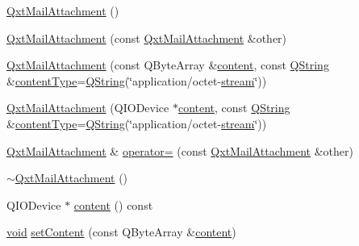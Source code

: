 \begin{DoxyCompactItemize}
\item 
\hyperlink{class_qxt_mail_attachment_a57fe8964d1858588d0a29f92b3d8db18}{Qxt\-Mail\-Attachment} ()
\item 
\hyperlink{class_qxt_mail_attachment_a2debcb1aa2891705bdfe0d49519b45c6}{Qxt\-Mail\-Attachment} (const \hyperlink{class_qxt_mail_attachment}{Qxt\-Mail\-Attachment} \&other)
\item 
\hyperlink{class_qxt_mail_attachment_a4b949899fa7ee16440ef40bc3560d8dc}{Qxt\-Mail\-Attachment} (const Q\-Byte\-Array \&\hyperlink{class_qxt_mail_attachment_a5be7967f47e110eabb937bd3642979cf}{content}, const \hyperlink{group___u_a_v_objects_plugin_gab9d252f49c333c94a72f97ce3105a32d}{Q\-String} \&\hyperlink{class_qxt_mail_attachment_ad94b991e86cd752c240556d5ccba3134}{content\-Type}=\hyperlink{group___u_a_v_objects_plugin_gab9d252f49c333c94a72f97ce3105a32d}{Q\-String}(\char`\"{}application/octet-\/\hyperlink{ioapi_8h_a4ed0a20697a8c37f8af699a8ec6d76a8}{stream}\char`\"{}))
\item 
\hyperlink{class_qxt_mail_attachment_a0b71743e1af5641282bc8505cebc9d8e}{Qxt\-Mail\-Attachment} (Q\-I\-O\-Device $\ast$\hyperlink{class_qxt_mail_attachment_a5be7967f47e110eabb937bd3642979cf}{content}, const \hyperlink{group___u_a_v_objects_plugin_gab9d252f49c333c94a72f97ce3105a32d}{Q\-String} \&\hyperlink{class_qxt_mail_attachment_ad94b991e86cd752c240556d5ccba3134}{content\-Type}=\hyperlink{group___u_a_v_objects_plugin_gab9d252f49c333c94a72f97ce3105a32d}{Q\-String}(\char`\"{}application/octet-\/\hyperlink{ioapi_8h_a4ed0a20697a8c37f8af699a8ec6d76a8}{stream}\char`\"{}))
\item 
\hyperlink{class_qxt_mail_attachment}{Qxt\-Mail\-Attachment} \& \hyperlink{class_qxt_mail_attachment_ae8434b636abbf1d5d80aa889a5a02965}{operator=} (const \hyperlink{class_qxt_mail_attachment}{Qxt\-Mail\-Attachment} \&other)
\item 
\hyperlink{class_qxt_mail_attachment_ad548deb713a55b42834ad80c71cef938}{$\sim$\-Qxt\-Mail\-Attachment} ()
\item 
Q\-I\-O\-Device $\ast$ \hyperlink{class_qxt_mail_attachment_a5be7967f47e110eabb937bd3642979cf}{content} () const 
\item 
\hyperlink{group___u_a_v_objects_plugin_ga444cf2ff3f0ecbe028adce838d373f5c}{void} \hyperlink{class_qxt_mail_attachment_a79c8ff7e5d8ed0f23162cbbf62bcb55b}{set\-Content} (const Q\-Byte\-Array \&\hyperlink{class_qxt_mail_attachment_a5be7967f47e110eabb937bd3642979cf}{content})
\item 

\end{DoxyCompactItemize}
